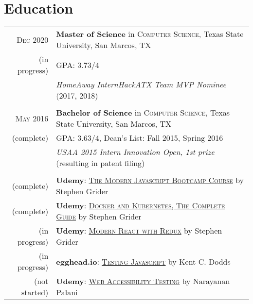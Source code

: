 \documentclass[a4paper,10pt]{article}
\begin{document}
\section{Education}
\begin{tabular}{rl}	
	\textsc{Dec} 2020 & \textbf{Master of Science} in \textsc{Computer Science}, Texas State University, San Marcos, TX\\
	
	(in progress) &\normalsize \textsc{GPA}: 3.73/4 \\ 
	
	& \emph{HomeAway InternHackATX Team MVP Nominee} (2017, 2018) \\
	
	& \\
	
	\textsc{May} 2016 & \textbf{Bachelor of Science} in \textsc{Computer Science}, Texas State University, San Marcos, TX \\
	
	(complete) &\normalsize \textsc{GPA}: 3.63/4,  Dean's List: Fall 2015, Spring 2016 \\
	
	& \emph{USAA 2015 Intern Innovation Open, 1st prize} (resulting in patent filing)  \\
	
	& \\
	
	(complete) & \textbf{Udemy}: \href {https://www.udemy.com/course/javascript-beginners-complete-tutorial/}{\textsc{The Modern Javascript Bootcamp Course}} by Stephen Grider \\
	
	(complete) & \textbf{Udemy}: \href {https://www.udemy.com/course/docker-and-kubernetes-the-complete-guide/}{\textsc{Docker and Kubernetes, The Complete Guide}} by Stephen Grider \\
	
	(in progress) & \textbf{Udemy}: \href {https://www.udemy.com/course/react-redux/}{\textsc{Modern React with Redux}} by Stephen Grider \\
	
	(in progress) & \textbf{egghead.io}: \href {https://testingjavascript.com/}{\textsc{Testing Javascript}} by Kent C. Dodds \\
	
	(not started) & \textbf{Udemy}: \href {https://www.udemy.com/course/webaccessibility/}{\textsc{Web Accessibility Testing}} by Narayanan Palani \\
	
	
\end{tabular}
\end{document}
